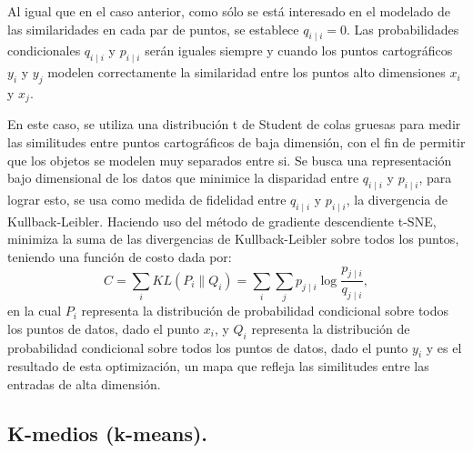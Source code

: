 \documentclass[12pt,letterpaper,oneside,openright]{book}
\begin{document}
	Al igual que en el caso anterior, como sólo se está interesado en el modelado de las similaridades en cada par de puntos, se establece $q_{i \mid i}=0$.
	Las probabilidades condicionales $q_{i \mid i}$ y $p_{i \mid i}$ serán iguales siempre y cuando los puntos cartográficos $y_i$ y $y_j$ modelen correctamente la similaridad entre los puntos alto dimensiones $x_i$ y $x_j$.
	
	En este caso, se utiliza una distribución t de Student de colas gruesas para medir las similitudes entre puntos cartográficos de baja dimensión, con el fin de permitir que los objetos se modelen muy separados entre si. 
	Se busca una representación bajo dimensional de los datos que minimice la disparidad entre $q_{i \mid i}$ y $p_{i \mid i}$, para lograr esto, se usa como medida de fidelidad entre $q_{i \mid i}$ y $p_{i \mid i}$, la divergencia de Kullback-Leibler. Haciendo uso del método de gradiente descendiente t-SNE, minimiza la suma de las divergencias de Kullback-Leibler sobre todos los puntos, teniendo una función de costo dada por: 
	\begin{equation}
		\label{eq:func_costo}
		C = \sum_i KL(P_i\|Q_i)=\sum_i\sum_j p_{j\mid i}\log\frac{p_{j\mid i}}{q_{j\mid i}},
	\end{equation}
	en la cual $P_i$ representa la distribución de probabilidad condicional sobre todos los puntos de datos, dado el punto $x_i$, y $Q_i$ representa la distribución de probabilidad condicional sobre todos los puntos de datos, dado el punto $y_i$ y es el resultado de esta optimización, un mapa que refleja las similitudes entre las entradas de alta dimensión.
	
\subsection{K-medios (k-means).}
\end{document}
